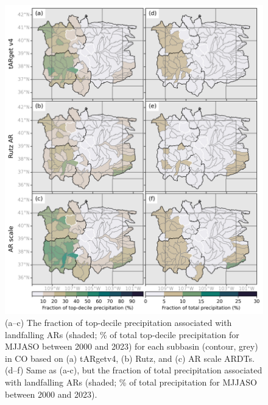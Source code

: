 \documentclass[draft,jgrga]{agutexSI2019}
\begin{document}
\begin{article}
\begin{figure}
\noindent\includegraphics[scale=0.8]{figS12.png}
\caption{(a–c) The fraction of top-decile precipitation associated with landfalling ARs (shaded; \% of total top-decile precipitation for MJJASO between 2000 and 2023) for each subbasin (contour, grey) in CO based on (a) tARgetv4, (b) Rutz, and (c) AR scale ARDTs. (d–f) Same as (a-c), but the fraction of total precipitation associated with landfalling ARs (shaded; \% of total precipitation for MJJASO between 2000 and 2023).}
\label{fig:supp:choropleth_MJJASO}
\end{figure}


\end{article}
\end{document}
